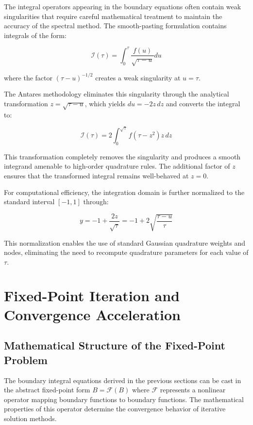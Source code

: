 \documentclass[
  american,
  11pt,
  11pt,
  letterpaper,
  onecolumn]{article}
\begin{document}
The integral operators appearing in the boundary equations often contain
weak singularities that require careful mathematical treatment to
maintain the accuracy of the spectral method. The smooth-pasting
formulation contains integrals of the form:

\[\mathcal{I}(\tau) = \int_0^\tau \frac{f(u)}{\sqrt{\tau-u}} du \tag{5.12}\]

where the factor \((\tau-u)^{-1/2}\) creates a weak singularity at
\(u = \tau\).

The Antares methodology eliminates this singularity through the
analytical transformation \(z = \sqrt{\tau-u}\), which yields
\(du = -2z \, dz\) and converts the integral to:

\[\mathcal{I}(\tau) = 2\int_0^{\sqrt{\tau}} f(\tau-z^2) z \, dz \tag{5.13}\]

This transformation completely removes the singularity and produces a
smooth integrand amenable to high-order quadrature rules. The additional
factor of \(z\) ensures that the transformed integral remains
well-behaved at \(z = 0\).

For computational efficiency, the integration domain is further
normalized to the standard interval \([-1,1]\) through:

\[y = -1 + \frac{2z}{\sqrt{\tau}} = -1 + 2\sqrt{\frac{\tau-u}{\tau}} \tag{5.14}\]

This normalization enables the use of standard Gaussian quadrature
weights and nodes, eliminating the need to recompute quadrature
parameters for each value of \(\tau\).

\section{Fixed-Point Iteration and Convergence
Acceleration}\label{fixed-point-iteration-and-convergence-acceleration}

\subsection{Mathematical Structure of the Fixed-Point
Problem}\label{mathematical-structure-of-the-fixed-point-problem}

The boundary integral equations derived in the previous sections can be
cast in the abstract fixed-point form \(B = \mathcal{F}(B)\) where
\(\mathcal{F}\) represents a nonlinear operator mapping boundary
functions to boundary functions. The mathematical properties of this
operator determine the convergence behavior of iterative solution
methods.
\end{document}

